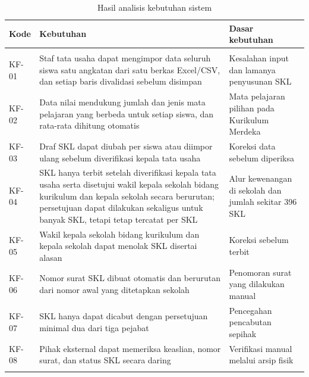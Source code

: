 \begin{table}[H]
    \centering
    \caption{Hasil analisis kebutuhan sistem}
    \label{table:3.kebutuhan}
    \footnotesize
    \renewcommand{\arraystretch}{1.25}
    \begin{tabular}{|>{\raggedright\arraybackslash}p{}|>{\raggedright\arraybackslash}p{}|>{\raggedright\arraybackslash}p{}|}
        \hline
        \textbf{Kode} & \textbf{Kebutuhan} & \textbf{Dasar kebutuhan} \\
        \hline
        \multicolumn{3}{|c|}{\textbf{Kebutuhan fungsional}} \\
        \hline
        KF-01 & Staf tata usaha dapat mengimpor data seluruh siswa satu angkatan dari satu berkas Excel/CSV, dan setiap baris divalidasi sebelum disimpan & Kesalahan input dan lamanya penyusunan SKL \\
        \hline
        KF-02 & Data nilai mendukung jumlah dan jenis mata pelajaran yang berbeda untuk setiap siswa, dan rata-rata dihitung otomatis & Mata pelajaran pilihan pada Kurikulum Merdeka \\
        \hline
        KF-03 & Draf SKL dapat diubah per siswa atau diimpor ulang sebelum diverifikasi kepala tata usaha & Koreksi data sebelum diperiksa \\
        \hline
        KF-04 & SKL hanya terbit setelah diverifikasi kepala tata usaha serta disetujui wakil kepala sekolah bidang kurikulum dan kepala sekolah secara berurutan; persetujuan dapat dilakukan sekaligus untuk banyak SKL, tetapi tetap tercatat per SKL & Alur kewenangan di sekolah dan jumlah sekitar 396 SKL \\
        \hline
        KF-05 & Wakil kepala sekolah bidang kurikulum dan kepala sekolah dapat menolak SKL disertai alasan & Koreksi sebelum terbit \\
        \hline
        KF-06 & Nomor surat SKL dibuat otomatis dan berurutan dari nomor awal yang ditetapkan sekolah & Penomoran surat yang dilakukan manual \\
        \hline
        KF-07 & SKL hanya dapat dicabut dengan persetujuan minimal dua dari tiga pejabat & Pencegahan pencabutan sepihak \\
        \hline
        KF-08 & Pihak eksternal dapat memeriksa keaslian, nomor surat, dan status SKL secara daring & Verifikasi manual melalui arsip fisik \\
        \hline
        \multicolumn{3}{|c|}{\textbf{Kebutuhan nonfungsional}} \\

\end{tabular}
\end{table}
